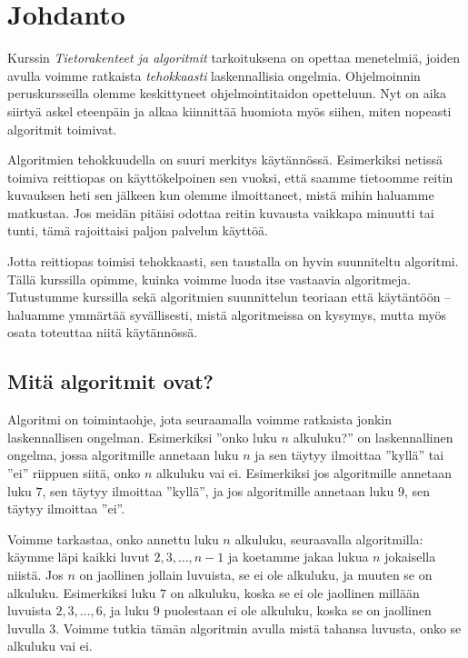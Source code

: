 \chapter{Johdanto}

Kurssin \emph{Tietorakenteet ja algoritmit} tarkoituksena
on opettaa menetelmiä, joiden avulla voimme ratkaista
\emph{tehokkaasti} laskennallisia ongelmia.
Ohjelmoinnin peruskursseilla olemme keskittyneet
ohjelmointitaidon opetteluun.
Nyt on aika siirtyä askel eteenpäin ja alkaa kiinnittää
huomiota myös siihen, miten nopeasti algoritmit toimivat.

Algoritmien tehokkuudella on suuri merkitys käytännössä.
Esimerkiksi netissä toimiva reittiopas on käyttökelpoinen sen vuoksi,
että saamme tietoomme reitin kuvauksen heti sen jälkeen kun olemme
ilmoittaneet, mistä mihin haluamme matkustaa.
Jos meidän pitäisi odottaa reitin kuvausta vaikkapa minuutti tai tunti,
tämä rajoittaisi paljon palvelun käyttöä.

Jotta reittiopas toimisi tehokkaasti, sen taustalla on
hyvin suunniteltu algoritmi.
Tällä kurssilla opimme, kuinka voimme luoda itse vastaavia algoritmeja.
Tutustumme kurssilla sekä algoritmien suunnittelun teoriaan että
käytäntöön -- haluamme ymmärtää syvällisesti, mistä algoritmeissa on kysymys,
mutta myös osata toteuttaa niitä käytännössä.

\section{Mitä algoritmit ovat?}

Algoritmi on toimintaohje, jota seuraamalla voimme ratkaista
jonkin laskennallisen ongelman.
Esimerkiksi ''onko luku $n$ alkuluku?'' on laskennallinen ongelma,
jossa algoritmille annetaan luku $n$
ja sen täytyy ilmoittaa ''kyllä'' tai ''ei'' riippuen siitä,
onko $n$ alkuluku vai ei.
Esimerkiksi jos algoritmille annetaan luku $7$,
sen täytyy ilmoittaa ''kyllä'',
ja jos algoritmille annetaan luku $9$,
sen täytyy ilmoittaa ''ei''.

Voimme tarkastaa, onko annettu luku $n$ alkuluku, seuraavalla algoritmilla:
käymme läpi kaikki luvut $2,3,\dots,n-1$ ja koetamme
jakaa lukua $n$ jokaisella niistä.
Jos $n$ on jaollinen jollain luvuista, se ei ole alkuluku,
ja muuten se on alkuluku.
Esimerkiksi luku $7$ on alkuluku, koska se ei ole jaollinen
millään luvuista $2,3,\dots,6$,
ja luku $9$ puolestaan ei ole alkuluku, koska se on jaollinen luvulla $3$.
Voimme tutkia tämän algoritmin avulla mistä tahansa luvusta,
onko se alkuluku vai ei.

